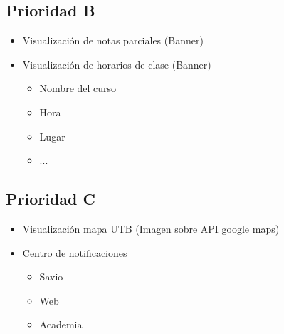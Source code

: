 \subsection{Prioridad B}
\begin{itemize}
 \item Visualización de notas parciales (Banner)
 \item Visualización de horarios de clase (Banner)
 \begin{itemize}
        \item Nombre del curso
        \item Hora
        \item Lugar
         \item ...
    \end{itemize}
\end{itemize}

\subsection{Prioridad C}
\begin{itemize}
 \item Visualización mapa UTB (Imagen sobre API google maps)
 \item Centro de notificaciones
     \begin{itemize}
         \item Savio
         \item Web
         \item Academia
    \end{itemize}
\end{itemize}